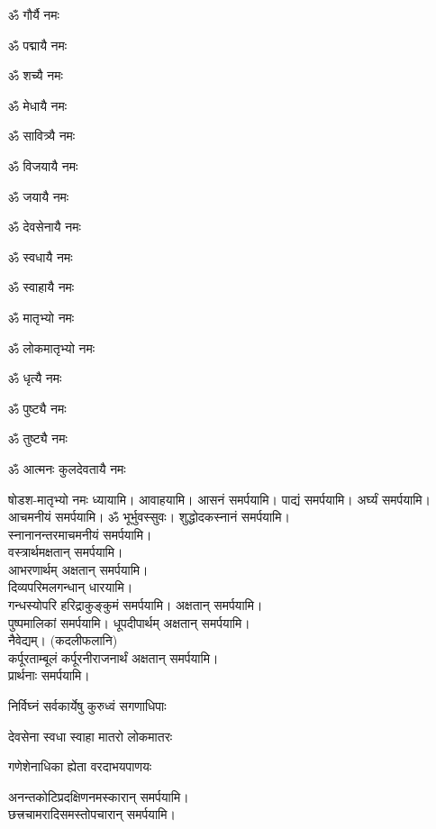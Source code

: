 
\begin{enumerate}%
\begin{minipage}{0.475\linewidth}   
\item ॐ गौर्यै नमः
\item ॐ पद्मायै नमः
\item ॐ शच्यै नमः
\item ॐ मेधायै नमः
\item ॐ सावित्र्यै नमः
\item ॐ विजयायै नमः
\item ॐ जयायै नमः
\item ॐ देवसेनायै नमः
  \end{minipage}
  \begin{minipage}{0.525\linewidth}
\item ॐ स्वधायै नमः
\item ॐ स्वाहायै नमः
\item ॐ मातृभ्यो नमः
\item ॐ लोकमातृभ्यो नमः
\item ॐ धृत्यै नमः
\item ॐ पुष्ट्यै नमः
\item ॐ तुष्ट्यै नमः
\item ॐ आत्मनः कुलदेवतायै नमः
  \end{minipage}
\end{enumerate}

षोडश-मातृभ्यो नमः ध्यायामि। आवाहयामि। आसनं समर्पयामि।
पाद्यं समर्पयामि। अर्घ्यं समर्पयामि। आचमनीयं समर्पयामि। 
ॐ भूर्भुवस्सुवः। शुद्धोदकस्नानं समर्पयामि।\\
स्नानानन्तरमाचमनीयं समर्पयामि।\\
वस्त्रार्थमक्षतान् समर्पयामि।\\
आभरणार्थम् अक्षतान् समर्पयामि।\\
दिव्यपरिमलगन्धान् धारयामि।\\
गन्धस्योपरि हरिद्राकुङ्कुमं समर्पयामि। अक्षतान् समर्पयामि। \\
पुष्पमालिकां समर्पयामि।
धूपदीपार्थम् अक्षतान् समर्पयामि।\\

नैवेद्यम्। (कदलीफलानि)\\
कर्पूरताम्बूलं कर्पूरनीराजनार्थं अक्षतान् समर्पयामि।\\
प्रार्थनाः समर्पयामि।

{निर्विघ्नं सर्वकार्येषु कुरुध्वं सगणाधिपाः}

{देवसेना स्वधा स्वाहा मातरो लोकमातरः}

{गणेशेनाधिका ह्येता वरदाभयपाणयः}


अनन्तकोटिप्रदक्षिणनमस्कारान् समर्पयामि।\\
छत्त्रचामरादिसमस्तोपचारान् समर्पयामि।\\